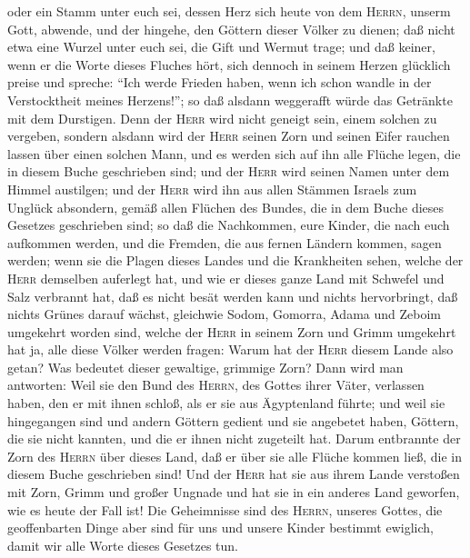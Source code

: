 oder ein Stamm unter euch sei, dessen Herz sich heute von dem
\textsc{Herrn}, unserm Gott, abwende, und der hingehe, den Göttern
dieser Völker zu dienen; daß nicht etwa eine Wurzel unter euch sei, die
Gift und Wermut trage;  und daß keiner, wenn er die Worte
dieses Fluches hört, sich dennoch in seinem Herzen glücklich preise und
spreche: ``Ich werde Frieden haben, wenn ich schon wandle in der
Verstocktheit meines Herzens!''; so daß alsdann weggerafft würde das
Getränkte mit dem Durstigen.  Denn der \textsc{Herr} wird
nicht geneigt sein, einem solchen zu vergeben, sondern alsdann wird der
\textsc{Herr} seinen Zorn und seinen Eifer rauchen lassen über einen
solchen Mann, und es werden sich auf ihn alle Flüche legen, die in
diesem Buche geschrieben sind; und der \textsc{Herr} wird seinen Namen
unter dem Himmel austilgen;  und der \textsc{Herr} wird
ihn aus allen Stämmen Israels zum Unglück absondern, gemäß allen Flüchen
des Bundes, die in dem Buche dieses Gesetzes geschrieben sind;
 so daß die Nachkommen, eure Kinder, die nach euch
aufkommen werden, und die Fremden, die aus fernen Ländern kommen, sagen
werden; wenn sie die Plagen dieses Landes und die Krankheiten sehen,
welche der \textsc{Herr} demselben auferlegt hat,  und
wie er dieses ganze Land mit Schwefel und Salz verbrannt hat, daß es
nicht besät werden kann und nichts hervorbringt, daß nichts Grünes
darauf wächst, gleichwie Sodom, Gomorra, Adama und Zeboim umgekehrt
worden sind, welche der \textsc{Herr} in seinem Zorn und Grimm umgekehrt
hat  ja, alle diese Völker werden fragen: Warum hat der
\textsc{Herr} diesem Lande also getan? Was bedeutet dieser gewaltige,
grimmige Zorn?  Dann wird man antworten: Weil sie den
Bund des \textsc{Herrn}, des Gottes ihrer Väter, verlassen haben, den er
mit ihnen schloß, als er sie aus Ägyptenland führte;  und
weil sie hingegangen sind und andern Göttern gedient und sie angebetet
haben, Göttern, die sie nicht kannten, und die er ihnen nicht zugeteilt
hat.  Darum entbrannte der Zorn des \textsc{Herrn} über
dieses Land, daß er über sie alle Flüche kommen ließ, die in diesem
Buche geschrieben sind!  Und der \textsc{Herr} hat sie
aus ihrem Lande verstoßen mit Zorn, Grimm und großer Ungnade und hat sie
in ein anderes Land geworfen, wie es heute der Fall ist! 
Die Geheimnisse sind des \textsc{Herrn}, unseres Gottes, die
geoffenbarten Dinge aber sind für uns und unsere Kinder bestimmt
ewiglich, damit wir alle Worte dieses Gesetzes tun.

